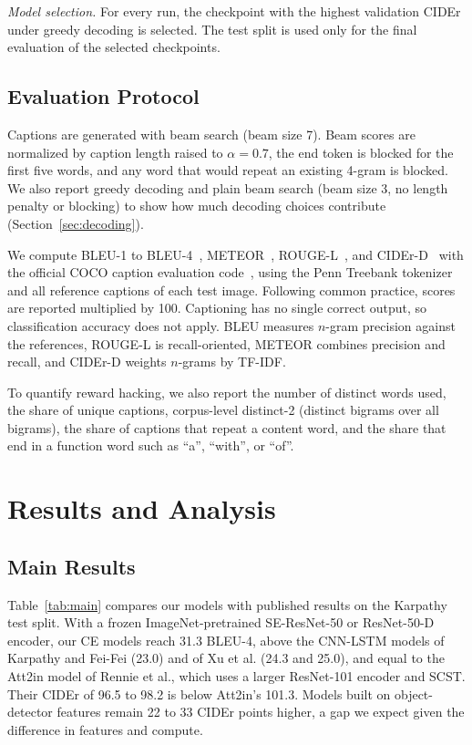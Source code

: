 \documentclass[conference]{IEEEtran}
\begin{document}
\textit{Model selection.} For every run, the checkpoint with the highest
validation CIDEr under greedy decoding is selected. The test split is used only
for the final evaluation of the selected checkpoints.

\subsection{Evaluation Protocol}
Captions are generated with beam search (beam size 7). Beam scores are
normalized by caption length raised to $\alpha=0.7$, the end token is blocked
for the first five words, and any word that would repeat an existing 4-gram is
blocked. We also report greedy decoding and plain beam search (beam size 3, no
length penalty or blocking) to show how much decoding choices contribute
(Section~\ref{sec:decoding}).

We compute BLEU-1 to BLEU-4~\cite{papineni2002bleu},
METEOR~\cite{banerjee2005meteor}, ROUGE-L~\cite{lin2004rouge}, and
CIDEr-D~\cite{vedantam2015cider} with the official COCO caption evaluation
code~\cite{chen2015microsoft}, using the Penn Treebank tokenizer and all
reference captions of each test image. Following common practice, scores are
reported multiplied by 100. Captioning has no single correct output, so
classification accuracy does not apply. BLEU measures $n$-gram precision
against the references, ROUGE-L is recall-oriented, METEOR combines precision
and recall, and CIDEr-D weights $n$-grams by TF-IDF.

To quantify reward hacking, we also report the number of distinct words used,
the share of unique captions, corpus-level distinct-2 (distinct bigrams over
all bigrams), the share of captions that repeat a content word, and the share
that end in a function word such as ``a'', ``with'', or ``of''.

\section{Results and Analysis}
\subsection{Main Results}
Table~\ref{tab:main} compares our models with published results on the
Karpathy test split. With a frozen ImageNet-pretrained SE-ResNet-50 or
ResNet-50-D encoder, our CE models reach 31.3 BLEU-4, above the CNN-LSTM
models of Karpathy and Fei-Fei (23.0) and of Xu et al. (24.3 and 25.0), and
equal to the Att2in model of Rennie et al.,
which uses a larger ResNet-101 encoder and SCST. Their CIDEr of 96.5 to 98.2 is
below Att2in's 101.3. Models built on object-detector features remain 22 to 33
CIDEr points higher, a gap we expect given the difference in features and
compute.
\end{document}
